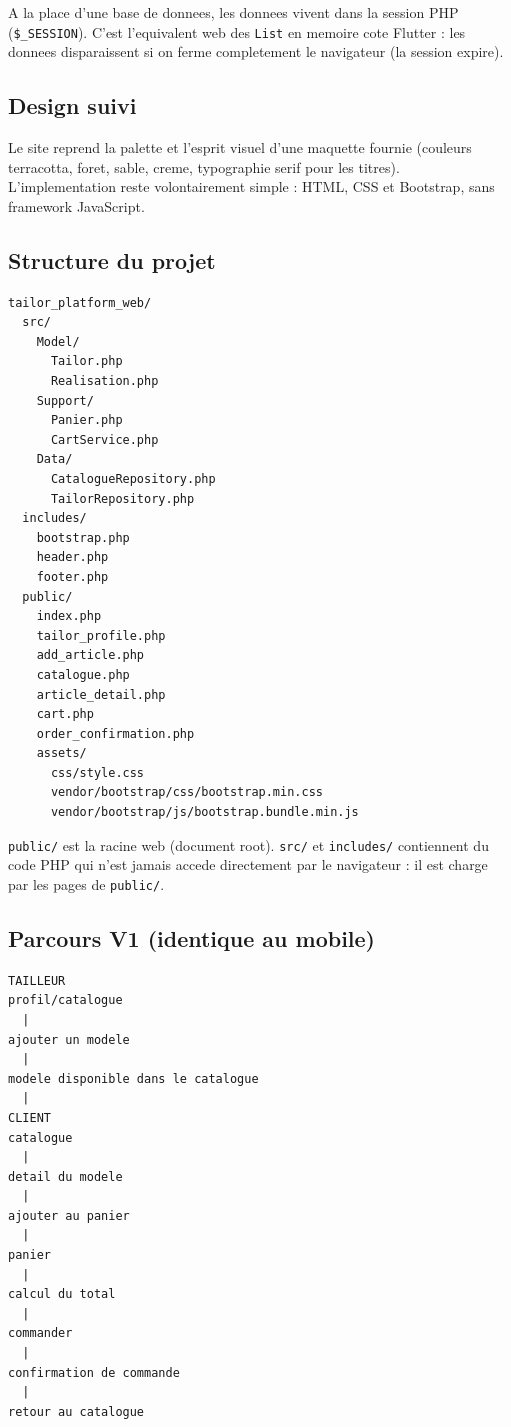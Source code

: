 \documentclass[11pt,a4paper]{article}
\begin{document}
A la place d'une base de donnees, les donnees vivent dans la session PHP
(\verb|$_SESSION|). C'est l'equivalent web des \verb|List| en memoire cote
Flutter : les donnees disparaissent si on ferme completement le navigateur
(la session expire).

\subsection{Design suivi}

Le site reprend la palette et l'esprit visuel d'une maquette fournie
(couleurs terracotta, foret, sable, creme, typographie serif pour les
titres). L'implementation reste volontairement simple : HTML, CSS et
Bootstrap, sans framework JavaScript.

\subsection{Structure du projet}

\begin{lstlisting}
tailor_platform_web/
  src/
    Model/
      Tailor.php
      Realisation.php
    Support/
      Panier.php
      CartService.php
    Data/
      CatalogueRepository.php
      TailorRepository.php
  includes/
    bootstrap.php
    header.php
    footer.php
  public/
    index.php
    tailor_profile.php
    add_article.php
    catalogue.php
    article_detail.php
    cart.php
    order_confirmation.php
    assets/
      css/style.css
      vendor/bootstrap/css/bootstrap.min.css
      vendor/bootstrap/js/bootstrap.bundle.min.js
\end{lstlisting}

\verb|public/| est la racine web (document root). \verb|src/| et
\verb|includes/| contiennent du code PHP qui n'est jamais accede
directement par le navigateur : il est charge par les pages de
\verb|public/|.

\subsection{Parcours V1 (identique au mobile)}

\begin{lstlisting}
TAILLEUR
profil/catalogue
  |
ajouter un modele
  |
modele disponible dans le catalogue
  |
CLIENT
catalogue
  |
detail du modele
  |
ajouter au panier
  |
panier
  |
calcul du total
  |
commander
  |
confirmation de commande
  |
retour au catalogue
\end{lstlisting}
\end{document}
